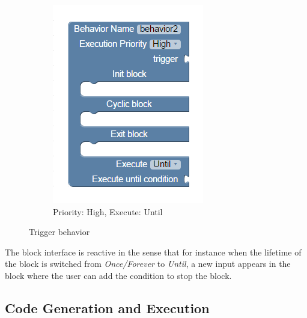 \begin{figure}[H]
\begin{subfigure}[t]{0.38\textwidth}
\includegraphics[width=\textwidth]{../thesis/assets/blocks_behavior2.png}
\caption[Example 2]{Priority: High, Execute: Until}
\label{fig:program_blocks}
\end{subfigure}
\caption[Trigger behavior]{Trigger behavior}
\label{fig:blocks_trigger}
\end{figure}
The block interface is reactive in the sense that for instance when the lifetime of the block is switched from \emph{Once/Forever} to \emph{Until}, a new input appears in the block where the user can add the condition to stop the block.
\subsection{Code Generation and Execution}

